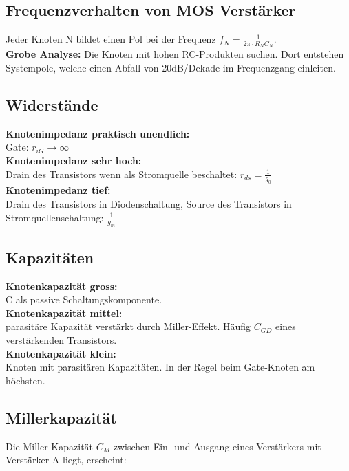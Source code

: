 \begin{multicols}{2}

\section{Frequenzverhalten von MOS Verstärker}
Jeder Knoten N bildet einen Pol bei der Frequenz
$f_N=\frac{1}{2\pi\cdot R_NC_N}$. \\
\textbf{Grobe Analyse:} Die Knoten mit hohen RC-Produkten suchen. Dort entstehen
Systempole, welche einen Abfall von 20dB/Dekade im Frequenzgang einleiten.

\subsection{Widerstände}
	\textbf{Knotenimpedanz praktisch unendlich:} \\ Gate: $r_{iG}\rightarrow\infty$ \\
	\textbf{Knotenimpedanz sehr hoch:} \\ Drain des Transistors wenn
		als Stromquelle beschaltet: $r_{ds}=\frac{1}{g_0}$  \\	
	\textbf{Knotenimpedanz tief:} \\ Drain des Transistors in
		Diodenschaltung, Source des Transistors in Stromquellenschaltung: $\frac{1}{g_m}$  \\
		
\subsection{Kapazitäten}
	\textbf{Knotenkapazität gross:} \\ C als passive Schaltungskomponente. \\
	\textbf{Knotenkapazität mittel:} \\ parasitäre Kapazität verstärkt durch Miller-Effekt.
	Häufig $C_{GD}$ eines verstärkenden Transistors. \\
	\textbf{Knotenkapazität klein:} \\ Knoten mit parasitären Kapazitäten. In der Regel beim
	Gate-Knoten am höchsten. \\

\columnbreak

\subsection{Millerkapazität}
Die Miller Kapazität $C_M$ zwischen Ein- und Ausgang eines Verstärkers mit
Verstärker A liegt, erscheint:\\


\end{multicols}
